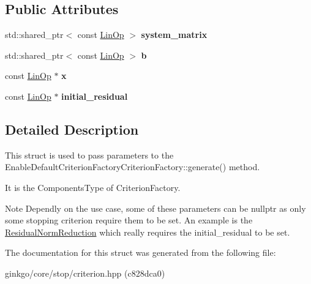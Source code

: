 \subsection*{Public Attributes}
\begin{DoxyCompactItemize}
\item 
\mbox{\label{structgko_1_1stop_1_1CriterionArgs_a2aa22bea76fd64352a446cf6c5570807}} 
std\+::shared\+\_\+ptr$<$ const \hyperlink{classgko_1_1LinOp}{Lin\+Op} $>$ {\bfseries system\+\_\+matrix}
\item 
\mbox{\label{structgko_1_1stop_1_1CriterionArgs_a994457497657a0308c5343e711ec4c3e}} 
std\+::shared\+\_\+ptr$<$ const \hyperlink{classgko_1_1LinOp}{Lin\+Op} $>$ {\bfseries b}
\item 
\mbox{\label{structgko_1_1stop_1_1CriterionArgs_a766a5c79ca77e74703888786e0011a73}} 
const \hyperlink{classgko_1_1LinOp}{Lin\+Op} $\ast$ {\bfseries x}
\item 
\mbox{\label{structgko_1_1stop_1_1CriterionArgs_af7233105d01a9b055b15652daf179a67}} 
const \hyperlink{classgko_1_1LinOp}{Lin\+Op} $\ast$ {\bfseries initial\+\_\+residual}
\end{DoxyCompactItemize}


\subsection{Detailed Description}
This struct is used to pass parameters to the Enable\+Default\+Criterion\+Factory\+Criterion\+Factory\+::generate() method. 

It is the Components\+Type of Criterion\+Factory.

\begin{DoxyNote}{Note}
Dependly on the use case, some of these parameters can be {\ttfamily nullptr} as only some stopping criterion require them to be set. An example is the {\ttfamily \hyperlink{classgko_1_1stop_1_1ResidualNormReduction}{Residual\+Norm\+Reduction}} which really requires the {\ttfamily initial\+\_\+residual} to be set. 
\end{DoxyNote}


The documentation for this struct was generated from the following file\+:\begin{DoxyCompactItemize}
\item 
ginkgo/core/stop/criterion.\+hpp (c828dca0)\end{DoxyCompactItemize}
